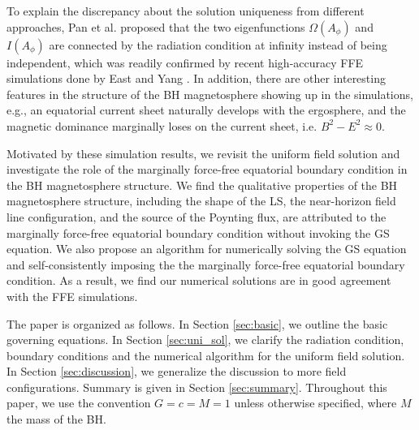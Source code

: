 \documentclass[aps,prd,reprint,nofootinbib, superscriptaddress]{revtex4-1}
\def\Ap{A_\phi}
\begin{document}
To explain the discrepancy about the solution uniqueness from different approaches, Pan et al.  \cite{Pan2017}
proposed that the two eigenfunctions $\Omega(\Ap)$ and $I(\Ap)$ are connected by the radiation condition at infinity instead of
being independent, which was readily confirmed by recent high-accuracy FFE simulations done
by East and Yang \cite{East2018}. In addition, there are other interesting features in the structure of the BH
magnetosphere showing up in the simulations, e.g., an equatorial current sheet naturally develops
with the ergosphere, and the magnetic dominance marginally loses on the current sheet, i.e. $B^2-E^2\approx 0$.

Motivated by these simulation results, we revisit the uniform field solution and investigate the role of the
marginally force-free equatorial boundary condition in the BH magnetosphere structure.
We find the qualitative properties of the BH magnetosphere structure, including the shape of the LS,
the near-horizon field line configuration, and the source of the Poynting flux, are attributed to the marginally
force-free equatorial boundary condition without invoking the GS equation.
We also  propose an algorithm for numerically solving the GS equation and
self-consistently imposing the the marginally force-free equatorial boundary condition.
As a result, we find our numerical solutions are in good agreement with the FFE simulations.


The paper is organized as follows.  In Section \ref{sec:basic}, we outline the basic governing equations.
In Section \ref{sec:uni_sol}, we clarify the radiation condition, boundary conditions and the numerical algorithm
for the uniform field solution. In Section \ref{sec:discussion}, we generalize the discussion
to  more field configurations. Summary is given in Section \ref{sec:summary}.
Throughout this paper, we use the convention $G=c=M=1$ unless otherwise specified,
where $M$ the mass of the BH.
\end{document}
